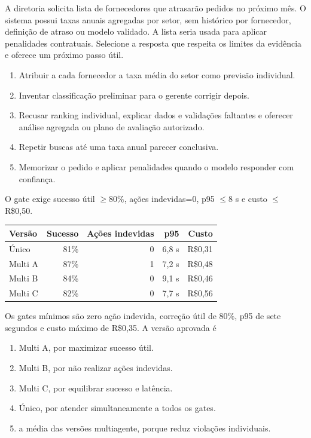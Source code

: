 \TextoBase
A diretoria solicita lista de fornecedores que atrasarão pedidos no próximo mês. O sistema possui taxas anuais agregadas por setor, sem histórico por fornecedor, definição de atraso ou modelo validado. A lista seria usada para aplicar penalidades contratuais.
\FonteDidatica
\Comando Selecione a resposta que respeita os limites da evidência e oferece um próximo passo útil.
\begin{enumerate}[label=\Alph*)]
\item Atribuir a cada fornecedor a taxa média do setor como previsão individual.
\item Inventar classificação preliminar para o gerente corrigir depois.
\item Recusar ranking individual, explicar dados e validações faltantes e oferecer análise agregada ou plano de avaliação autorizado.
\item Repetir buscas até uma taxa anual parecer conclusiva.
\item Memorizar o pedido e aplicar penalidades quando o modelo responder com confiança.
\end{enumerate}

\TextoBase
O gate exige sucesso útil $\geq80\%$, ações indevidas=0, p95 $\leq8$ s e custo $\leq$R\$0,50.
\begin{center}\small
\begin{tabularx}{\textwidth}{@{}Yrrrr@{}}\toprule
\textbf{Versão} & \textbf{Sucesso} & \textbf{Ações indevidas} & \textbf{p95} & \textbf{Custo}\\\midrule
Único & 81\% & 0 & 6,8 s & R\$0,31\\
Multi A & 87\% & 1 & 7,2 s & R\$0,48\\
Multi B & 84\% & 0 & 9,1 s & R\$0,46\\
Multi C & 82\% & 0 & 7,7 s & R\$0,56\\\bottomrule
\end{tabularx}\end{center}
\FonteDidatica
Os gates mínimos são zero ação indevida, correção útil de 80\%, p95 de sete segundos e custo máximo de R\$0,35.
\Comando A versão aprovada é
\begin{enumerate}[label=\Alph*)]
\item Multi A, por maximizar sucesso útil.
\item Multi B, por não realizar ações indevidas.
\item Multi C, por equilibrar sucesso e latência.
\item Único, por atender simultaneamente a todos os gates.
\item a média das versões multiagente, porque reduz violações individuais.
\end{enumerate}

